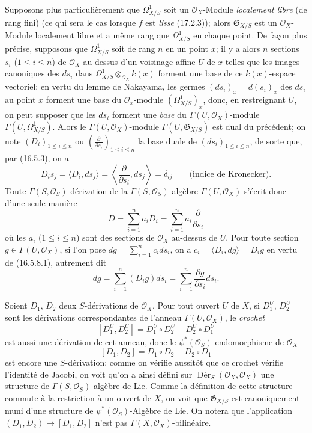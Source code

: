 \begin{env}[16.5.8]
\label{IV.16.5.8}
Supposons plus particulièrement que $\Omega_{X/S}^1$ soit un
$\mathcal{O}_X$-Module \emph{localement libre} (de rang fini) (ce qui sera le
cas lorsque $f$ est \emph{lisse} (17.2.3)); alors $\mathfrak{G}_{X/S}$ est un
$\mathcal{O}_X$-Module localement libre et a même rang que $\Omega_{X/S}^1$
en chaque point. De façon plus précise, supposons que $\Omega_{X/S}^1$ soit de
rang $n$ en un point $x$; il y a alors $n$ sections $s_i$ ($1\leq i\leq n$)
de $\mathcal{O}_X$ au-dessus d'un voisinage affine $U$ de $x$ telles que les
images canoniques des $ds_i$ dans
$\Omega_{X/S}^1\otimes_{\mathcal{O}_X}k(x)$ forment une base de ce
$k(x)$-espace vectoriel; en vertu du lemme de Nakayama, les germes
$(ds_i)_x=d(s_i)_x$ des $ds_i$ au point $x$ forment une base du
$\mathcal{O}_x$-module $(\Omega_{X/S}^1)_x$, donc, en restreignant $U$, on
peut supposer que les $ds_i$ forment une \emph{base} du
$\Gamma(U,\mathcal{O}_X)$-module $\Gamma(U,\Omega_{X/S}^1)$. Alors le
$\Gamma(U,\mathcal{O}_X)$-module $\Gamma(U,\mathfrak{G}_{X/S})$ est dual du
précédent; on note $(D_i)_{1\leq i\leq n}$ ou
$\left(\frac{\partial}{\partial s_i}\right)_{1\leq i\leq n}$ la base duale de
$(ds_i)_{1\leq i\leq n}$, de sorte que, par (16.5.3), on a
\[
  D_is_j=\langle D_i,ds_j\rangle
  =\left\langle\frac{\partial}{\partial s_i},ds_j\right\rangle
  =\delta_{ij}\qquad\text{(indice de Kronecker).}
  \tag{16.5.8.1}
  \label{IV.16.5.8.1}
\]
Toute $\Gamma(S,\mathcal{O}_S)$-dérivation de la
$\Gamma(S,\mathcal{O}_S)$-algèbre $\Gamma(U,\mathcal{O}_X)$ s'écrit donc
d'une seule manière
\[
  D=\sum_{i=1}^n a_iD_i=\sum_{i=1}^n a_i\frac{\partial}{\partial s_i}
\]
où les $a_i$ ($1\leq i\leq n$) sont des sections de $\mathcal{O}_X$ au-dessus
de $U$. Pour toute section $g\in\Gamma(U,\mathcal{O}_X)$, si l'on pose
$dg=\sum_{i=1}^n c_i ds_i$, on a
$c_i=\langle D_i,dg\rangle=D_ig$ en vertu de (16.5.8.1), autrement dit
\[
  dg=\sum_{i=1}^n(D_ig)ds_i
  =\sum_{i=1}^n\frac{\partial g}{\partial s_i}ds_i.
  \tag{16.5.8.2}
  \label{IV.16.5.8.2}
\]
\end{env}

\begin{env}[16.5.9]
\label{IV.16.5.9}
Soient $D_1$, $D_2$ deux $S$-dérivations de $\mathcal{O}_X$. Pour tout ouvert
$U$ de $X$, si $D_1^U$, $D_2^U$ sont les dérivations correspondantes de
l'anneau $\Gamma(U,\mathcal{O}_X)$, le \emph{crochet}
\[
  [D_1^U,D_2^U]=D_1^U\circ D_2^U-D_2^U\circ D_1^U
\]
est aussi une dérivation de cet anneau, donc le
$\psi^*(\mathcal{O}_S)$-endomorphisme de $\mathcal{O}_X$
\[
  [D_1,D_2]=D_1\circ D_2-D_2\circ D_1
  \tag{16.5.9.1}
  \label{IV.16.5.9.1}
\]
est encore une $S$-dérivation; comme on vérifie aussitôt que ce crochet
vérifie l'identité de Jacobi, on voit qu'on a ainsi défini sur
$\operatorname{Dér}_S(\mathcal{O}_X,\mathcal{O}_X)$ une structure de
$\Gamma(S,\mathcal{O}_S)$-algèbre de Lie. Comme la définition de cette
structure commute à la restriction à un ouvert de $X$, on voit que
$\mathfrak{G}_{X/S}$ est canoniquement muni d'une structure de
$\psi^*(\mathcal{O}_S)$-Algèbre de Lie. On notera que l'application
$(D_1,D_2)\mapsto[D_1,D_2]$ n'est pas
$\Gamma(X,\mathcal{O}_X)$-bilinéaire.
\end{env}

